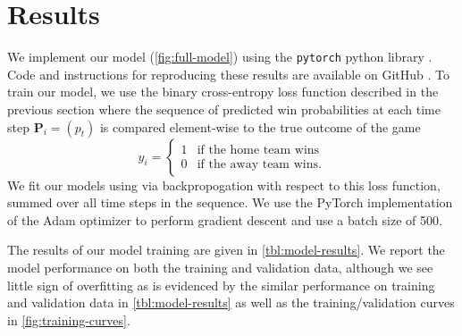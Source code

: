 \section{Results}

We implement our model (\autoref{fig:full-model}) using the \texttt{pytorch} python library \cite{pytorch}. Code and instructions for reproducing these results are available on GitHub \cite{stat-comps-github}. To train our model, we use the binary cross-entropy loss function described in the previous section where the sequence of predicted win probabilities at each time step $\mathbf P_i = (p_t)$ is compared element-wise to the true outcome of the game
\begin{equation}
	y_i = \begin{cases}
		1 & \text{if the home team wins}  \\
		0 & \text{if the away team wins}.
	\end{cases}
\end{equation}
We fit our models using via backpropogation with respect to this loss function, summed over all time steps in the sequence. We use the PyTorch implementation of the Adam optimizer \cite{adam} to perform gradient descent and use a batch size of 500.

The results of our model training are given in \autoref{tbl:model-results}. We report the model performance on both the training and validation data, although we see little sign of overfitting as is evidenced by the similar performance on training and validation data in \autoref{tbl:model-results} as well as the training/validation curves in \autoref{fig:training-curves}.

